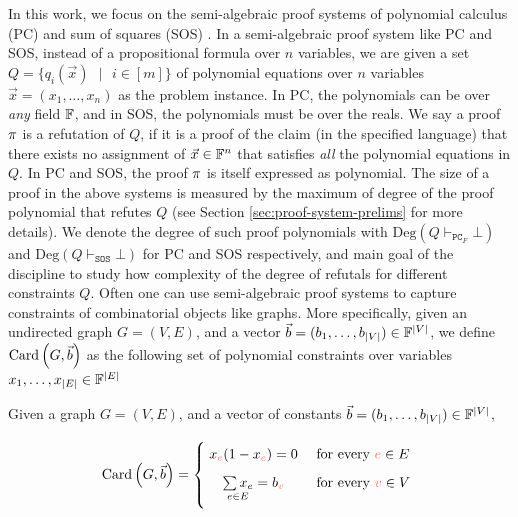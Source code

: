 \documentclass[11pt]{article}
\newcommand{\Degree}[1]{\text{Deg}\left(#1\right)}
\newcommand{\PC}{\vdash_{\texttt{PC}_F}}
\newcommand{\SOS}{\vdash_{\texttt{SOS}}}
\begin{document}
In this work, we focus on the semi-algebraic proof systems of polynomial calculus (PC) \citep{alekhnovich2004pseudorandom} and sum of squares (SOS) \citep{parrilo2000structured, boazCourse}.
In a semi-algebraic proof system like PC and SOS, instead of a propositional formula over $n$ variables, we are given a set $Q=\{q_i(\vec{x}) \text{ } |\text{ } i \in [m] \}$ of polynomial equations over $n$ variables $\vec{x} = (x_1, \dots, x_n)$ as the problem instance.
In PC, the polynomials can be over \emph{any} field $\mathbb{F}$, and in SOS, the polynomials must be over the reals.
We say a proof $\pi$ is a refutation of $Q$, if it is a proof of the claim (in the specified language) that there exists no assignment of $\vec{x} \in \mathbb{F}^n$ that satisfies \emph{all} the polynomial equations in $Q$. 
In PC and SOS, the proof $\pi$ is itself expressed as polynomial.  
The size of a proof in the above systems is measured by the maximum of degree of the proof polynomial that refutes $Q$ (see Section \ref{sec:proof-system-prelims} for more details).
We denote the degree of such proof polynomials with $\Degree{Q \PC \bot}$ and $\Degree{Q \SOS \bot}$ for PC and SOS respectively, and  main goal of the discipline to study how complexity of the degree of refutals for different constraints $Q$.
Often one can use semi-algebraic proof systems to capture constraints of combinatorial objects like graphs.
More specifically, given an undirected graph $G=(V,E)$, and a vector $\vec{b} = (b_1, \dots, b_{|V|})  \in \mathbb{F}^{\left|V\right|}$, we define $\text{Card}\left(G, \vec{b}\right)$ as the following set of polynomial constraints over variables $x_1, \dots, x_{|E|} \in \mathbb{F}^{\left|E\right|}$



\begin{definition}[Card]\label{def:card}Given a graph $G=(V,E)$, and a vector of constants $\vec{b} = (b_1, \dots, b_{|V|}) \in \mathbb{F}^{|V|}$,

\begin{displaymath}
        \Card{G, \vec{b}}=
        \Bigger[10]\{\begin{array}{@{}cl}
                x_{\highlight{e}}(1 - x_{\highlight{e}}) = 0 & \text{ for every $\highlight{e} \in E$}\\[3mm]
                \underset{e \in E}{\sum x_e}= b_{\highlight{v}} & \text{ for every $\highlight{v} \in V$} \\[3mm]
        \end{array}
\end{displaymath}
	
\end{definition}
\end{document}
